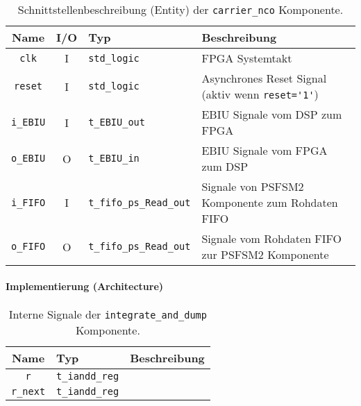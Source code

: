 \begin{table}[htbp]
    \ttabbox
    {
        \caption[Carrier NCO Schnittstelle]{Schnittstellenbeschreibung (Entity) der \lstinline$carrier_nco$ Komponente.}
        \label{TabPSFSM_Entity}
    }
    {
    \begin{tabular}{c c  p{2cm} p{6cm}}
        \toprule
        Name                & I/O	& Typ				                & Beschreibung \\
        \midrule
        \lstinline$clk$	    & I	    & \lstinline$std_logic$	        	& FPGA Systemtakt\\
        \lstinline$reset$	& I	    & \lstinline$std_logic$	        	& Asynchrones Reset Signal (aktiv wenn \lstinline$reset='1'$) \\
        \lstinline$i_EBIU$	& I	    & \lstinline$t_EBIU_out$	    	& EBIU Signale vom DSP zum FPGA\\
        \lstinline$o_EBIU$	& O	    & \lstinline$t_EBIU_in$		        & EBIU Signale vom FPGA zum DSP\\
        \lstinline$i_FIFO$	& I	    & \lstinline$t_fifo_ps_Read_out$	& Signale von PSFSM2 Komponente zum Rohdaten FIFO \\
        \lstinline$o_FIFO$	& O	    & \lstinline$t_fifo_ps_Read_out$	& Signale vom Rohdaten FIFO zur PSFSM2 Komponente \\
        \bottomrule
    \end{tabular}
}
\end{table}


\paragraph{Implementierung (Architecture)}

\begin{table}[htbp]
    \ttabbox
    {
        \caption[Carrier NCO interne Signale]{Interne Signale der \lstinline$integrate_and_dump$ Komponente.}
        \label{TabIandD_ArchSignals}
    }
    {
    \begin{tabular}{c  p{2cm} p{6cm}}
        \toprule
        Name      		& Typ         & Beschreibung \\
        \midrule
        \lstinline$r$		& \lstinline$t_iandd_reg$ & \\
        \lstinline$r_next$	& \lstinline$t_iandd_reg$ & \\
        \bottomrule
    \end{tabular}
}
\end{table}


